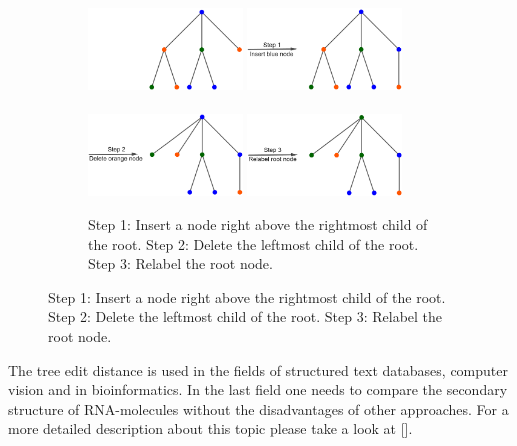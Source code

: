 \begin{figure}[!h]
    \begin{subfigure}[b]{\textwidth}
		\includegraphics[width=0.45\textwidth]{figures/TreeEditExample_3.jpg}
		\quad
		\includegraphics[width=0.45\textwidth]{figures/TreeEditExample_4.jpg}
		\\ %
		\\
		\includegraphics[width=0.45\textwidth]{figures/TreeEditExample_5.jpg}
		\quad
		\includegraphics[width=0.45\textwidth]{figures/TreeEditExample_6.jpg}
		\caption{Step 1: Insert a node right above the rightmost child of the root. Step 2: Delete the leftmost child of the root. Step 3: Relabel the root node.}
	\end{subfigure}
	\label{fig:TEE}
\end{figure}
The tree edit distance is used in the fields of structured text databases, computer vision and in bioinformatics. In the last field one needs to compare the secondary structure of RNA-molecules without the disadvantages of other approaches. For a more detailed description about this topic please take a look at [].


